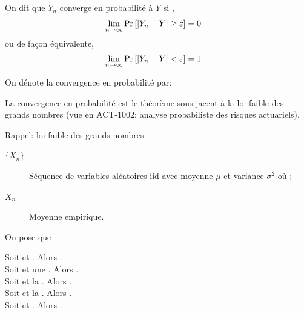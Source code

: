 \documentclass[french]{article}
\begin{document}
\begin{multicols*}{2}
\begin{definitionNOHFILL}
On dit que $Y_{n}$ converge en probabilité à $Y$ si , 
\begin{align*}
	\underset{n \rightarrow \infty}{\lim} \Pr\left[|Y_{n}	-	Y|	\geq	\varepsilon\right]	
	&=	0
\end{align*}
ou de façon équivalente,
\begin{align*}
	\underset{n \rightarrow \infty}{\lim} \Pr\left[|Y_{n}	-	Y|<	\varepsilon\right]	
	&=	1
\end{align*}

On dénote la convergence en probabilité par: 
\end{definitionNOHFILL}

La convergence en probabilité est le théorème sous-jacent à la loi faible des grands nombres (vue en ACT-1002: analyse probabiliste des risques actuariels).

\begin{rappel}{Rappel: loi faible des grands nombres}
\begin{distributions}[Notation]
\begin{description}
	\item[$\{X_{n}\}$]	Séquence de variables aléatoires iid avec moyenne $\mu$ et variance $\sigma^{2}$ où ;
	\item[$\overline{X}_{n}$]	Moyenne empirique.
\end{description}
\end{distributions}

On pose que 
\end{rappel}

\begin{definitionNOHFILLprop}
Soit  et . Alors .\\
Soit  et une . Alors .\\
Soit  et la . Alors .\\
Soit  et la . Alors .\\
Soit  et . Alors .
\end{definitionNOHFILLprop}



\end{multicols*}
\end{document}

